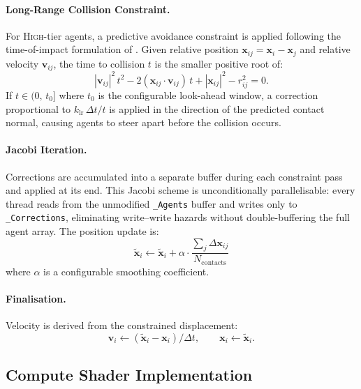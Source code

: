\paragraph{Long-Range Collision Constraint.}
For \textsc{High}-tier agents, a predictive avoidance constraint is applied
following the time-of-impact formulation of \cite{weiss2019}.  Given relative
position $\mathbf{x}_{ij} = \mathbf{x}_i - \mathbf{x}_j$ and relative
velocity $\mathbf{v}_{ij}$, the time to collision $t$ is the smaller positive
root of:
\begin{equation}
    |\mathbf{v}_{ij}|^2\,t^2 - 2(\mathbf{x}_{ij}\cdot\mathbf{v}_{ij})\,t
    + |\mathbf{x}_{ij}|^2 - r_{ij}^2 = 0.
\end{equation}
If $t \in (0,\,t_0]$ where $t_0$ is the configurable look-ahead window, a
correction proportional to $k_{\mathrm{lr}}\,\Delta t / t$ is applied in the
direction of the predicted contact normal, causing agents to steer apart before
the collision occurs.

\paragraph{Jacobi Iteration.}
Corrections are accumulated into a separate buffer during each constraint pass
and applied at its end.  This Jacobi scheme is unconditionally parallelisable:
every thread reads from the unmodified \texttt{\_Agents} buffer and writes
only to \texttt{\_Corrections}, eliminating write--write hazards without
double-buffering the full agent array.  The position update is:
\begin{equation}
    \tilde{\mathbf{x}}_i \leftarrow \tilde{\mathbf{x}}_i
    + \alpha \cdot \frac{\displaystyle\sum_j \Delta\mathbf{x}_{ij}}{N_{\mathrm{contacts}}}
\end{equation}
where $\alpha$ is a configurable smoothing coefficient.

\paragraph{Finalisation.}
Velocity is derived from the constrained displacement:
\begin{equation}
    \mathbf{v}_i \leftarrow (\tilde{\mathbf{x}}_i - \mathbf{x}_i) / \Delta t,
    \qquad \mathbf{x}_i \leftarrow \tilde{\mathbf{x}}_i.
\end{equation}

\subsection{Compute Shader Implementation}

